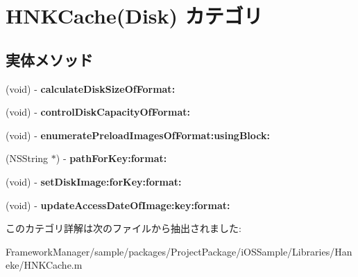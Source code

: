 \hypertarget{category_h_n_k_cache_07_disk_08}{}\section{H\+N\+K\+Cache(Disk) カテゴリ}
\label{category_h_n_k_cache_07_disk_08}
\subsection*{実体メソッド}
\begin{DoxyCompactItemize}
\item 
\hypertarget{category_h_n_k_cache_07_disk_08_afbadcba7b71d63245accb74d89afd25b}{}(void) -\/ {\bfseries calculate\+Disk\+Size\+Of\+Format\+:}\label{category_h_n_k_cache_07_disk_08_afbadcba7b71d63245accb74d89afd25b}

\item 
\hypertarget{category_h_n_k_cache_07_disk_08_aa394cf735bae522f5223caf3fff5dd88}{}(void) -\/ {\bfseries control\+Disk\+Capacity\+Of\+Format\+:}\label{category_h_n_k_cache_07_disk_08_aa394cf735bae522f5223caf3fff5dd88}

\item 
\hypertarget{category_h_n_k_cache_07_disk_08_a0d8cfbaca7af6d0ac99890b2d76e911c}{}(void) -\/ {\bfseries enumerate\+Preload\+Images\+Of\+Format\+:using\+Block\+:}\label{category_h_n_k_cache_07_disk_08_a0d8cfbaca7af6d0ac99890b2d76e911c}

\item 
\hypertarget{category_h_n_k_cache_07_disk_08_ad7fda49046b3b544c8ab36b15816cd57}{}(N\+S\+String $\ast$) -\/ {\bfseries path\+For\+Key\+:format\+:}\label{category_h_n_k_cache_07_disk_08_ad7fda49046b3b544c8ab36b15816cd57}

\item 
\hypertarget{category_h_n_k_cache_07_disk_08_a5596b986ef8201af28f9c94645fc0ad6}{}(void) -\/ {\bfseries set\+Disk\+Image\+:for\+Key\+:format\+:}\label{category_h_n_k_cache_07_disk_08_a5596b986ef8201af28f9c94645fc0ad6}

\item 
\hypertarget{category_h_n_k_cache_07_disk_08_aabd57e6ea200455699b55b2a5e5435ef}{}(void) -\/ {\bfseries update\+Access\+Date\+Of\+Image\+:key\+:format\+:}\label{category_h_n_k_cache_07_disk_08_aabd57e6ea200455699b55b2a5e5435ef}

\end{DoxyCompactItemize}


このカテゴリ詳解は次のファイルから抽出されました\+:\begin{DoxyCompactItemize}
\item 
Framework\+Manager/sample/packages/\+Project\+Package/i\+O\+S\+Sample/\+Libraries/\+Haneke/H\+N\+K\+Cache.\+m\end{DoxyCompactItemize}
